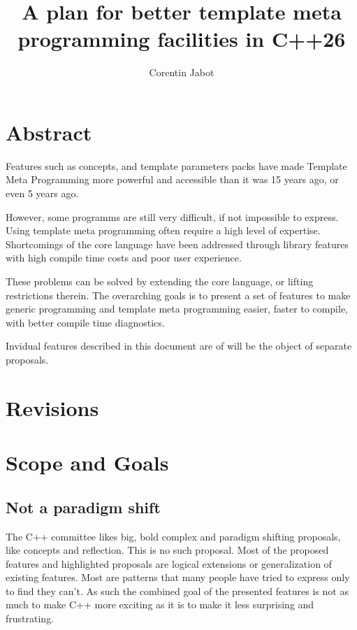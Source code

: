\documentclass{wg21}
\title{A plan for better template meta programming facilities in C++26}
\author{Corentin Jabot}{corentin.jabot@gmail.com}
\begin{document}
\maketitle

\section{Abstract}

Features such as concepts,  and template parameters packs have made Template Meta Programming more powerful and accessible than it was 15 years ago, or even 5 years ago.

However, some programms are still very difficult, if not impossible to express. Using template meta programming often require a high level of expertise.
Shortcomings of the core language have been addressed through library features with high compile time costs and poor user experience.

These problems can be solved by extending the core language, or lifting restrictions therein.
The overarching goals is to present a set of features to make generic programming and template meta programming easier,
faster to compile, with better compile time diagnostics.

Invidual features described in this document are of will be the object of separate proposals.


\section{Revisions}

\section{Scope and Goals}

\subsection{Not a paradigm shift}

The C++ committee likes big, bold complex and paradigm shifting proposals, like concepts and reflection.
This is no such proposal.
Most of the proposed features and highlighted proposals are logical extensions or generalization of existing features.
Most are patterns that many people have tried to express only to find they can't.
As such the combined goal of the presented features is not as much to make C++ more exciting as it is to make it less surprising and frustrating.
\end{document}
